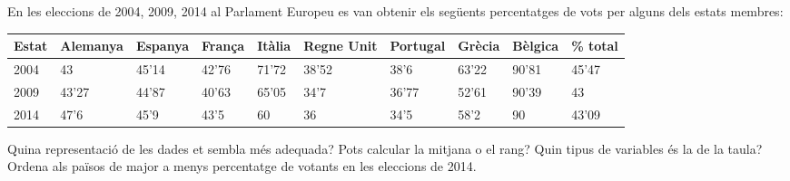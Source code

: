 \begin{mylist}

\vso
 \exer En les eleccions de 2004, 2009, 2014 al Parlament Europeu es van obtenir els següents percentatges de vots per alguns dels estats membres: 

\begin{longtable}{|p{0.4in}|p{0.6in}|p{0.5in}|p{0.4in}|p{0.4in}|p{0.4in}|p{0.5in}|p{0.4in}|p{0.5in}|p{0.5in}|} \hline 
Estat & Alemanya & Espanya & França & Itàlia & Regne Unit & Portugal & Grècia & Bèlgica & \% total \\ \hline 
2004 & 43 & 45'14 & 42'76 & 71'72 & 38'52 & 38'6 & 63'22 & 90'81 & 45'47 \\ \hline 
2009 & 43'27 & 44'87 & 40'63 & 65'05 & 34'7 & 36'77 & 52'61 & 90'39 & 43 \\ \hline 
2014 & 47'6 & 45'9 & 43'5 & 60 & 36 & 34'5 & 58'2 & 90 & 43'09 \\ \hline 
\end{longtable}

Quina representació de les dades et sembla més adequada? Pots calcular la mitjana o el rang? Quin tipus de variables és la de la taula? Ordena als països de major a menys percentatge de votants en les eleccions de 2014.
\vso
{}


\end{mylist}

